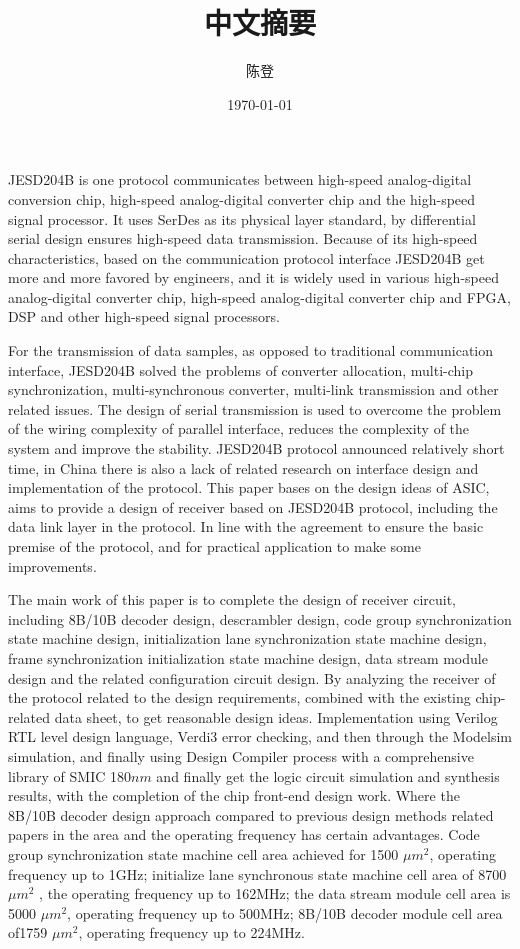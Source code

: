 \documentclass[UTF8]{ctexart}
\title{中文摘要}
\author{陈登}
\date{\today}
\begin{document}
JESD204B is one protocol communicates between high-speed analog-digital conversion chip, high-speed analog-digital converter chip and the high-speed signal processor. It uses SerDes as its physical layer standard, by differential serial design ensures high-speed data transmission. Because of its high-speed characteristics, based on the communication protocol interface JESD204B get more and more favored by engineers, and it is widely used in various high-speed analog-digital converter chip, high-speed analog-digital converter chip and FPGA, DSP and other high-speed signal processors.

For the transmission of data samples, as opposed to traditional communication interface, JESD204B solved the problems of converter allocation, multi-chip synchronization, multi-synchronous converter, multi-link transmission and other related issues. The design of serial transmission is used to overcome the problem of the wiring complexity of parallel interface, reduces the complexity of the system and improve the stability. JESD204B protocol announced relatively short time, in China there is also a lack of related research on interface design and implementation of the protocol. This paper bases on the design ideas of ASIC, aims to provide a design of receiver based on JESD204B protocol, including the data link layer in the protocol. In line with the agreement to ensure the basic premise of the protocol, and for practical application to make some improvements.

The main work of this paper is to complete the design of receiver circuit, including 8B/10B decoder design, descrambler design, code group synchronization state machine design, initialization lane synchronization state machine design, frame synchronization initialization state machine design, data stream module design and the related configuration circuit design. By analyzing the receiver of the protocol related to the design requirements, combined with the existing chip-related data sheet, to get reasonable design ideas. Implementation using Verilog RTL level design language, Verdi3 error checking, and then through the Modelsim simulation, and finally using Design Compiler process with a comprehensive library of SMIC 180$nm$ and finally get the logic circuit simulation and synthesis results, with the completion of the chip front-end design work. Where the 8B/10B decoder design approach compared to previous design methods related papers in the area and the operating frequency has certain advantages. Code group synchronization state machine cell area achieved for 1500 $\mu m^2$, operating frequency up to 1GHz; initialize lane synchronous state machine cell area of ​​8700 $\mu m^2$ , the operating frequency up to 162MHz; the data stream module cell area is 5000 $\mu m^2$, operating frequency up to 500MHz; 8B/10B decoder module cell area of ​​1759 $\mu m^2$, operating frequency up to 224MHz.


\end{document}

